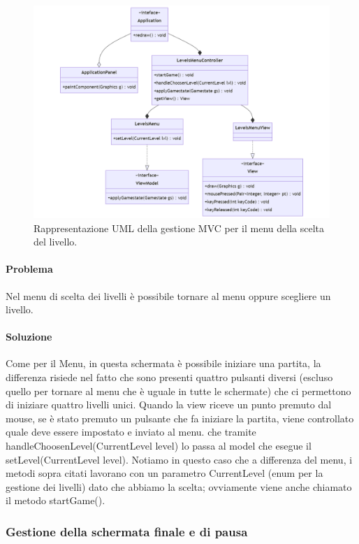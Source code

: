 \documentclass[a4paper,12pt]{report}
\begin{document}
\begin{figure}[H]
\centering{}
\includegraphics[width=\textwidth]{img/levelsmenu.png}
\caption{Rappresentazione UML della gestione MVC per il menu della scelta del livello.}
\end{figure}

\paragraph{Problema} Nel menu di scelta dei livelli è possibile tornare al menu oppure scegliere un livello.

\paragraph{Soluzione} Come per il Menu, in questa schermata è possibile iniziare una partita, la differenza risiede nel fatto che sono presenti quattro pulsanti diversi (escluso quello per tornare al menu che è uguale in tutte le schermate) che ci permettono di iniziare quattro livelli unici. Quando la view riceve un punto premuto dal mouse, se è stato premuto un pulsante che fa iniziare la partita, viene controllato quale deve essere impostato e inviato al menu. che tramite handleChoosenLevel(CurrentLevel level) lo passa al model che esegue il setLevel(CurrentLevel level). Notiamo in questo caso che a differenza del menu, i metodi sopra citati lavorano con un parametro CurrentLevel (enum per la gestione dei livelli) dato che abbiamo la scelta; ovviamente viene anche chiamato il metodo startGame().

\subsubsection{Gestione della schermata finale e di pausa}
\end{document}
